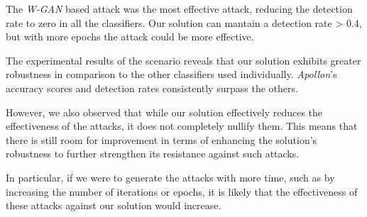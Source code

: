 The \textit{W-GAN} based attack was the most effective attack, reducing the detection rate to zero in all the classifiers.
Our solution can mantain a detection rate > 0.4, but with more epochs the attack could be more effective.


The experimental results of the scenario reveals that our solution exhibits greater robustness in comparison to the
other classifiers used individually.
\textit{Apollon}'s accuracy scores and detection rates consistently surpass the others.

However, we also observed that while our solution effectively reduces the effectiveness of the attacks, it does not
completely nullify them.
This means that there is still room for improvement in terms of enhancing the solution's robustness to further strengthen
its resistance against such attacks.

In particular, if we were to generate the attacks with more time, such as by increasing the number of iterations or epochs,
it is likely that the effectiveness of these attacks against our solution would increase.